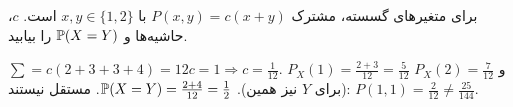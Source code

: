 \begin{exercise}
برای متغیرهای گسسته،  مشترک $P(x,y)=c(x+y)$ با $x,y\in\{1,2\}$ است. $c$، حاشیه‌ها و $\mathbb{P}(X=Y)$ را بیابید.
\end{exercise}
\begin{solution}
$\sum=c(2+3+3+4)=12c=1\Rightarrow c=\frac1{12}$. $P_X(1)=\frac{2+3}{12}=\frac5{12}$ و $P_X(2)=\frac7{12}$ (برای $Y$ نیز همین). $\mathbb{P}(X=Y)=\frac{2+4}{12}=\frac12$. مستقل نیستند: $P(1,1)=\frac2{12}\ne\frac{25}{144}$.
\end{solution}
